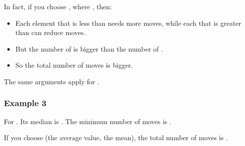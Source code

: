 \documentclass[letterpaper,12pt,english]{book}
\begin{document}
\sphinxAtStartPar
In fact, if you choose , where , then:
\begin{itemize}
\item {} 
\sphinxAtStartPar
Each element  that is less than  needs more  moves, while each  that is greater than  can reduce  moves.

\item {} 
\sphinxAtStartPar
But the number of  is bigger than the number of .

\item {} 
\sphinxAtStartPar
So the total number of moves is bigger.

\end{itemize}

\sphinxAtStartPar
The same arguments apply for .


\subsubsection{Example 3}
\label{\detokenize{Mathematics/09_MTH_462_Minimum_Moves_to_Equal_Array_Elements_II:example-3}}
\sphinxAtStartPar
For . Its median is . The minimum number of moves is .

\sphinxAtStartPar
If you choose  (the average value, the mean), the total number of moves is .
\end{document}
